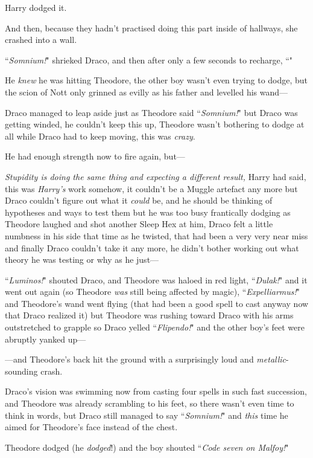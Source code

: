 Harry dodged it.

And then, because they hadn't practised doing this part inside of hallways, she crashed into a wall.

\later

``\emph{Somnium!}" shrieked Draco, and then after only a few seconds to recharge, ``"

He \emph{knew} he was hitting Theodore, the other boy wasn't even trying to dodge, but the scion of Nott only grinned as evilly as his father and levelled his wand—

Draco managed to leap aside just as Theodore said ``\emph{Somnium!}" but Draco was getting winded, he couldn't keep this up, Theodore wasn't bothering to dodge at all while Draco had to keep moving, this was \emph{crazy}.

He had enough strength now to fire again, but—

\emph{Stupidity is doing the same thing and expecting a different result,} Harry had said, this was \emph{Harry's} work somehow, it couldn't be a Muggle artefact any more but Draco couldn't figure out what it \emph{could} be, and he should be thinking of hypotheses and ways to test them but he was too busy frantically dodging as Theodore laughed and shot another Sleep Hex at him, Draco felt a little numbness in his side that time as he twisted, that had been a very very near miss and finally Draco couldn't take it any more, he didn't bother working out what theory he was testing or why as he just—

``\emph{Luminos!}" shouted Draco, and Theodore was haloed in red light, ``\emph{Dulak!}" and it went out again (so Theodore \emph{was} still being affected by magic), ``\emph{Expelliarmus!}" and Theodore's wand went flying (that had been a good spell to cast anyway now that Draco realized it) but Theodore was rushing toward Draco with his arms outstretched to grapple so Draco yelled ``\emph{Flipendo!}" and the other boy's feet were abruptly yanked up—

—and Theodore's back hit the ground with a surprisingly loud and \emph{metallic}-sounding crash.

Draco's vision was swimming now from casting four spells in such fast succession, and Theodore was already scrambling to his feet, so there wasn't even time to think in words, but Draco still managed to say ``\emph{Somnium!}" and \emph{this} time he aimed for Theodore's face instead of the chest.

Theodore dodged (he \emph{dodged}!) and the boy shouted ``\emph{Code seven on Malfoy!}"

